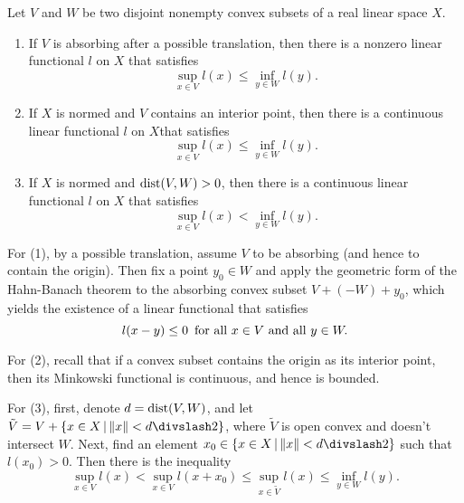 \begin{theorem}
  Let $V$ and $W$ be two disjoint nonempty convex subsets of a real linear space $X$.
  \begin{enumerate}
    \item If $V$ is absorbing after a possible translation, then there is a nonzero linear functional $l$ on $X$ that satisfies
    \begin{equation*}
        \sup_{x\in V}l(x)\leq\inf_{y\in W}l(y).
      \end{equation*}
    \item If $X$ is normed and $V$ contains an interior point, then there is a continuous linear functional $l$ on $X$that satisfies
    \begin{equation*}
      \sup_{x\in V}l(x)\leq\inf_{y\in W}l(y).
    \end{equation*}
    \item If $X$ is normed and $\operatorname{dist}(V, W)>0$, then there is a continuous linear functional $l$ on $X$ that satisfies
    \begin{equation*}
      \sup_{x\in V}l(x)<\inf_{y\in W}l(y).
    \end{equation*}
  \end{enumerate}
\end{theorem}

\begin{hint}
  For (1), by a possible translation, assume $V$ to be absorbing (and hence to contain the origin). Then fix a point $y_0\in W$ and apply the geometric form of the Hahn-Banach theorem to the absorbing convex subset $V+(-W)+y_0$, which yields the existence of a linear functional that satisfies
  \begin{equation*}
    l(x-y)\leq 0\text{\enskip for all }x\in V\text{ and all }y\in W.
  \end{equation*}

  For (2), recall that if a convex subset contains the origin as its interior point, then its Minkowski functional is continuous, and hence is bounded.

  For (3), first, denote $d=\operatorname{dist}(V, W)$, and let $\tilde V = V + \{x\in X\VERT \NORM x< d\DIV 2\}$, where $\tilde V$ is open convex and doesn't intersect $W$. Next, find an element $x_0\in \{x\in X\VERT \NORM x< d\DIV 2\}$ such that $l(x_0)>0$. Then there is the inequality
  \begin{equation*}
    \sup_{x\in V}l(x)<\sup_{x\in V}l(x+x_0)\leq\sup_{x\in\tilde V}l(x)\leq \inf_{y\in W}l(y).
  \end{equation*}
\end{hint}

